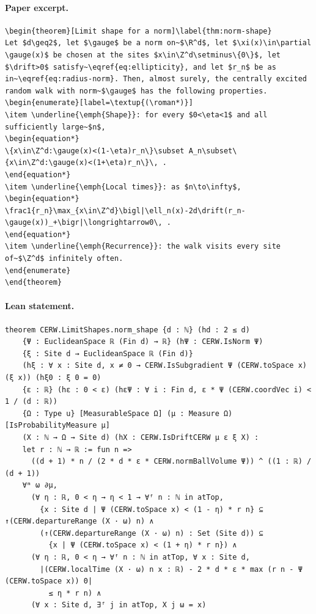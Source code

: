 \paragraph{Paper excerpt.}
\begin{verbatim}
\begin{theorem}[Limit shape for a norm]\label{thm:norm-shape}
Let $d\geq2$, let $\gauge$ be a norm on~$\R^d$, let $\xi(x)\in\partial \gauge(x)$ be chosen at the sites $x\in\Z^d\setminus\{0\}$, let $\drift>0$ satisfy~\eqref{eq:ellipticity}, and let $r_n$ be as in~\eqref{eq:radius-norm}. Then, almost surely, the centrally excited random walk with norm~$\gauge$ has the following properties.
\begin{enumerate}[label=\textup{(\roman*)}]
\item \underline{\emph{Shape}}: for every $0<\eta<1$ and all sufficiently large~$n$,
\begin{equation*}
\{x\in\Z^d:\gauge(x)<(1-\eta)r_n\}\subset A_n\subset\{x\in\Z^d:\gauge(x)<(1+\eta)r_n\}\, .
\end{equation*}
\item \underline{\emph{Local times}}: as $n\to\infty$,
\begin{equation*}
\frac1{r_n}\max_{x\in\Z^d}\bigl|\ell_n(x)-2d\drift(r_n-\gauge(x))_+\bigr|\longrightarrow0\, .
\end{equation*}
\item \underline{\emph{Recurrence}}: the walk visits every site of~$\Z^d$ infinitely often.
\end{enumerate}
\end{theorem}
\end{verbatim}
\paragraph{Lean statement.}
\begin{verbatim}
theorem CERW.LimitShapes.norm_shape {d : ℕ} (hd : 2 ≤ d)
    {Ψ : EuclideanSpace ℝ (Fin d) → ℝ} (hΨ : CERW.IsNorm Ψ)
    {ξ : Site d → EuclideanSpace ℝ (Fin d)}
    (hξ : ∀ x : Site d, x ≠ 0 → CERW.IsSubgradient Ψ (CERW.toSpace x) (ξ x)) (hξ0 : ξ 0 = 0)
    {ε : ℝ} (hε : 0 < ε) (hεΨ : ∀ i : Fin d, ε * Ψ (CERW.coordVec i) < 1 / (d : ℝ))
    {Ω : Type u} [MeasurableSpace Ω] (μ : Measure Ω) [IsProbabilityMeasure μ]
    (X : ℕ → Ω → Site d) (hX : CERW.IsDriftCERW μ ε ξ X) :
    let r : ℕ → ℝ := fun n =>
      ((d + 1) * n / (2 * d * ε * CERW.normBallVolume Ψ)) ^ ((1 : ℝ) / (d + 1))
    ∀ᵐ ω ∂μ,
      (∀ η : ℝ, 0 < η → η < 1 → ∀ᶠ n : ℕ in atTop,
        {x : Site d | Ψ (CERW.toSpace x) < (1 - η) * r n} ⊆ ↑(CERW.departureRange (X · ω) n) ∧
        (↑(CERW.departureRange (X · ω) n) : Set (Site d)) ⊆
          {x | Ψ (CERW.toSpace x) < (1 + η) * r n}) ∧
      (∀ η : ℝ, 0 < η → ∀ᶠ n : ℕ in atTop, ∀ x : Site d,
        |(CERW.localTime (X · ω) n x : ℝ) - 2 * d * ε * max (r n - Ψ (CERW.toSpace x)) 0|
          ≤ η * r n) ∧
      (∀ x : Site d, ∃ᶠ j in atTop, X j ω = x)
\end{verbatim}

